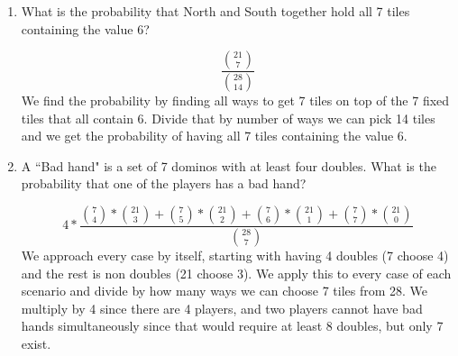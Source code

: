 \documentclass[10pt,letterpaper,unboxed,cm]{article}
\begin{document}
\begin{enumerate}
\begin{enumerate}
\begin{solution}
    Let event A be the event that North has no tiles containing a 6.
    Let event B be the event that North has no tiles containing a blank.
    Then the probability that North has at least one domino with a 6 and at least one domino with a blank is:
    \[1 - P(A) - P(B)\]
    But we are over substracting that one tile that has both a 6 and a blank. So by Inclusion-Exclusion, we can add it back in by:
    \[\boxed{1 - P(A) - P(B) + P(A \cap B)}\]
    The probability of A and B is the same as part b, so out solution becomes:
    \[\boxed{1 - \frac{\binom{21}{7}}{\binom{28}{7}} - \frac{\binom{21}{7}}{\binom{28}{7}} + \frac{\binom{15}{7}}{\binom{28}{7}}} = 1 - 2*\frac{\binom{21}{7}}{\binom{28}{7}} + \frac{\binom{15}{7}}{\binom{28}{7}}\]
    We get 15 choose 7 from the intersection of A and B = 28 - (7 + 7 - 1), because we are looking for dominos that don't have 6 or
    aren't blank, but we add 1 back in because of that one tile that is 6 and blank.
\end{solution}

\item
What is the probability that North and South together hold all 7 tiles containing the value 6?

\begin{solution}
    
    \[\boxed{\frac{\binom{21}{7}}{\binom{28}{14}}}\]
    We find the probability by finding all ways to get 7 tiles on top of the 7 fixed tiles that all contain 6.
    Divide that by number of ways we can pick 14 tiles and we get the probability of having all 7 tiles containing the value 6. 

\end{solution}

\item
A ``Bad hand" is a set of 7 dominos with at least four doubles. What is the probability that one of the players has a bad hand?

\begin{solution}
\[\boxed{4*\frac{\binom{7}{4}*\binom{21}{3} + \binom{7}{5}*\binom{21}{2} + \binom{7}{6}*\binom{21}{1} + \binom{7}{7}*\binom{21}{0}}{\binom{28}{7}}}\]
We approach every case by itself, starting with having 4 doubles (7 choose 4) and the rest is non doubles (21 choose 3).
We apply this to every case of each scenario and divide by how many ways we can choose 7 tiles from 28.
We multiply by 4 since there are 4 players, and two players cannot have bad hands simultaneously since that would require at least 8 doubles, but only 7 exist.
\end{solution}


\end{enumerate}
\end{enumerate}
\end{document}
